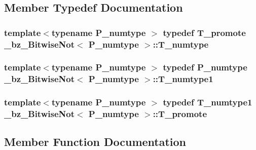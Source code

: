 \subsection{Member Typedef Documentation}
\hypertarget{class__bz__BitwiseNot_afbdc61fb87c4ab2ec06a2e7e18f5c293}{}
\subsubsection[{T\+\_\+numtype}]{\setlength{\rightskip}{0pt plus 5cm}template$<$typename P\+\_\+numtype $>$ typedef {\bf T\+\_\+promote} {\bf \+\_\+bz\+\_\+\+Bitwise\+Not}$<$ P\+\_\+numtype $>$\+::{\bf T\+\_\+numtype}}\label{class__bz__BitwiseNot_afbdc61fb87c4ab2ec06a2e7e18f5c293}
\hypertarget{class__bz__BitwiseNot_aab2c96e74bdf626c5397d64321958c81}{}
\subsubsection[{T\+\_\+numtype1}]{\setlength{\rightskip}{0pt plus 5cm}template$<$typename P\+\_\+numtype $>$ typedef P\+\_\+numtype {\bf \+\_\+bz\+\_\+\+Bitwise\+Not}$<$ P\+\_\+numtype $>$\+::{\bf T\+\_\+numtype1}}\label{class__bz__BitwiseNot_aab2c96e74bdf626c5397d64321958c81}
\hypertarget{class__bz__BitwiseNot_a4200c2f96e8c801f9028fb73383ca454}{}
\subsubsection[{T\+\_\+promote}]{\setlength{\rightskip}{0pt plus 5cm}template$<$typename P\+\_\+numtype $>$ typedef {\bf T\+\_\+numtype1} {\bf \+\_\+bz\+\_\+\+Bitwise\+Not}$<$ P\+\_\+numtype $>$\+::{\bf T\+\_\+promote}}\label{class__bz__BitwiseNot_a4200c2f96e8c801f9028fb73383ca454}


\subsection{Member Function Documentation}
\hypertarget{class__bz__BitwiseNot_a135f233a80c47beb88ed42fb8ac5c407}{}
